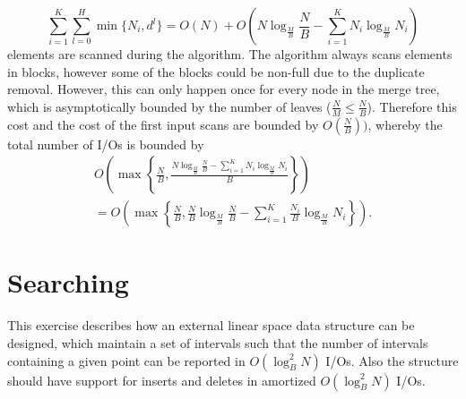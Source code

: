 \documentclass[a4paper,12pt]{article}
\begin{document}
\[
  \sum_{i=1}^K \sum_{l = 0}^H \min\{N_i, d^l\} = O(N) + O\left( N \log_{\frac{M}{B}}{\frac{N}{B}} - \sum_{i = 1}^K N_i \log_{\frac{M}{B}}{N_i} \right)
\]
elements are scanned during the algorithm. The algorithm always scans elements in blocks, however some of the blocks could be non-full due to the duplicate removal. However, this can only happen once for every node in the merge tree, which is asymptotically bounded by the number of leaves ($\frac{N}{M} \leq \frac{N}{B}$). Therefore this cost and the cost of the first input scans are bounded by $O(\frac{N}{B}))$, whereby the total number of I/Os is bounded by
\begin{align*}
  O\left( \max\left\{ \frac{N}{B}, \frac{N \log_{\frac{M}{B}}{\frac{N}{B}} - \sum_{i = 1}^K N_i \log_{\frac{M}{B}}{N_i}}{B} \right\} \right) \\
    = O\left( \max\left\{ \frac{N}{B}, \frac{N}{B} \log_{\frac{M}{B}}{\frac{N}{B}} - \sum_{i=1}^K \frac{N_i}{B} \log_{\frac{M}{B}}{N_i} \right\} \right).
\end{align*}

\pagebreak
\section{Searching}
This exercise describes how an external linear space data structure can be designed, which maintain a set of intervals such that the number of intervals containing a given point can be reported in $O(\log_B^2 N)$ I/Os. Also the structure should have support for inserts and deletes in amortized $O(\log_B^2 N)$ I/Os.
\end{document}
